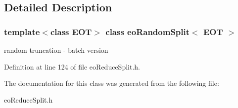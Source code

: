 \subsection{Detailed Description}
\subsubsection*{template$<$class EOT$>$ class eo\-Random\-Split$<$ EOT $>$}

random truncation - batch version 



Definition at line 124 of file eo\-Reduce\-Split.h.

The documentation for this class was generated from the following file:\begin{CompactItemize}
\item 
eo\-Reduce\-Split.h\end{CompactItemize}
